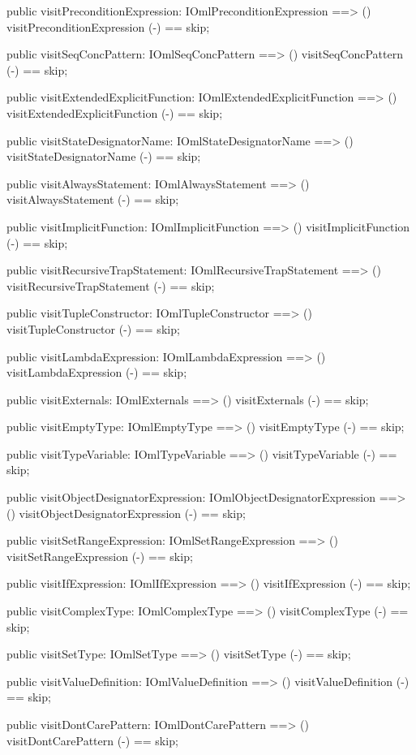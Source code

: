 \begin{vdm_al}
  public visitPreconditionExpression: IOmlPreconditionExpression ==> ()
  visitPreconditionExpression (-) == skip;

  public visitSeqConcPattern: IOmlSeqConcPattern ==> ()
  visitSeqConcPattern (-) == skip;

  public visitExtendedExplicitFunction: IOmlExtendedExplicitFunction ==> ()
  visitExtendedExplicitFunction (-) == skip;

  public visitStateDesignatorName: IOmlStateDesignatorName ==> ()
  visitStateDesignatorName (-) == skip;

  public visitAlwaysStatement: IOmlAlwaysStatement ==> ()
  visitAlwaysStatement (-) == skip;

  public visitImplicitFunction: IOmlImplicitFunction ==> ()
  visitImplicitFunction (-) == skip;

  public visitRecursiveTrapStatement: IOmlRecursiveTrapStatement ==> ()
  visitRecursiveTrapStatement (-) == skip;

  public visitTupleConstructor: IOmlTupleConstructor ==> ()
  visitTupleConstructor (-) == skip;

  public visitLambdaExpression: IOmlLambdaExpression ==> ()
  visitLambdaExpression (-) == skip;

  public visitExternals: IOmlExternals ==> ()
  visitExternals (-) == skip;

  public visitEmptyType: IOmlEmptyType ==> ()
  visitEmptyType (-) == skip;

  public visitTypeVariable: IOmlTypeVariable ==> ()
  visitTypeVariable (-) == skip;

  public visitObjectDesignatorExpression: IOmlObjectDesignatorExpression ==> ()
  visitObjectDesignatorExpression (-) == skip;

  public visitSetRangeExpression: IOmlSetRangeExpression ==> ()
  visitSetRangeExpression (-) == skip;

  public visitIfExpression: IOmlIfExpression ==> ()
  visitIfExpression (-) == skip;

  public visitComplexType: IOmlComplexType ==> ()
  visitComplexType (-) == skip;

  public visitSetType: IOmlSetType ==> ()
  visitSetType (-) == skip;

  public visitValueDefinition: IOmlValueDefinition ==> ()
  visitValueDefinition (-) == skip;

  public visitDontCarePattern: IOmlDontCarePattern ==> ()
  visitDontCarePattern (-) == skip;


\end{vdm_al}
